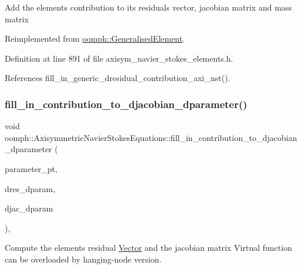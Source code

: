 Add the element\textquotesingle{}s contribution to its residuals vector, jacobian matrix and mass matrix 

Reimplemented from \hyperlink{classoomph_1_1GeneralisedElement_a2d6e3c918ebc1f270eebdf4eb1027093}{oomph\+::\+Generalised\+Element}.



Definition at line 891 of file axisym\+\_\+navier\+\_\+stokes\+\_\+elements.\+h.



References fill\+\_\+in\+\_\+generic\+\_\+dresidual\+\_\+contribution\+\_\+axi\+\_\+nst().

\mbox{\label{classoomph_1_1AxisymmetricNavierStokesEquations_ad8ac18903e3e4e63301bfe67d5e08361}} 
\subsubsection{\texorpdfstring{fill\+\_\+in\+\_\+contribution\+\_\+to\+\_\+djacobian\+\_\+dparameter()}{fill\_in\_contribution\_to\_djacobian\_dparameter()}}
{\footnotesize\ttfamily void oomph\+::\+Axisymmetric\+Navier\+Stokes\+Equations\+::fill\+\_\+in\+\_\+contribution\+\_\+to\+\_\+djacobian\+\_\+dparameter (\begin{DoxyParamCaption}\item[{double $\ast$const \&}]{parameter\+\_\+pt,  }\item[{\hyperlink{classoomph_1_1Vector}{Vector}$<$ double $>$ \&}]{dres\+\_\+dparam,  }\item[{\hyperlink{classoomph_1_1DenseMatrix}{Dense\+Matrix}$<$ double $>$ \&}]{djac\+\_\+dparam }\end{DoxyParamCaption})\hspace{0.3cm}{\ttfamily [inline]}, {\ttfamily [virtual]}}



Compute the element\textquotesingle{}s residual \hyperlink{classoomph_1_1Vector}{Vector} and the jacobian matrix Virtual function can be overloaded by hanging-\/node version. 



